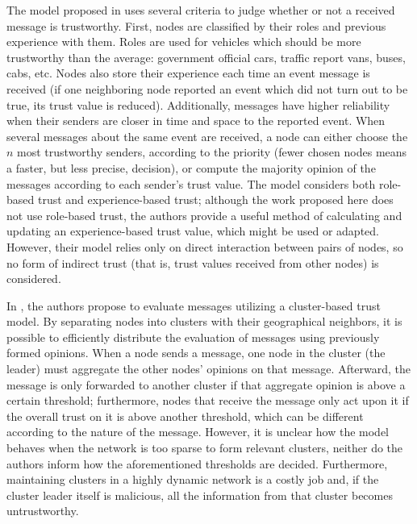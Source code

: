 The model proposed in \cite{minhas2010towards} uses several criteria to judge whether or not a received message is trustworthy.
First, nodes are classified by their roles and previous experience with them.
Roles are used for vehicles which should be more trustworthy than the average: government official cars, traffic report vans, buses, cabs, etc.
Nodes also store their experience each time an event message is received (if one neighboring node reported an event which did not turn out to be true, its trust value is reduced).
Additionally, messages have higher reliability when their senders are closer in time and space to the reported event.
When several messages about the same event are received, a node can either choose the $n$ most trustworthy senders, according to the priority (fewer chosen nodes means a faster, but less precise, decision), or compute the majority opinion of the messages according to each sender's trust value.
The model considers both role-based trust and experience-based trust; although the work proposed here does not use role-based trust, the authors provide a useful method of calculating and updating an experience-based trust value, which might be used or adapted.
However, their model relies only on direct interaction between pairs of nodes, so no form of indirect trust (that is, trust values received from other nodes) is considered.


In \cite{chen2010trust}, the authors propose to evaluate messages utilizing a cluster-based trust model.
By separating nodes into clusters with their geographical neighbors, it is possible to efficiently distribute the evaluation of messages using previously formed opinions.
When a node sends a message, one node in the cluster (the leader) must aggregate the other nodes' opinions on that message.
Afterward, the message is only forwarded to another cluster if that aggregate opinion is above a certain threshold; furthermore, nodes that receive the message only act upon it if the overall trust on it is above another threshold, which can be different according to the nature of the message.
However, it is unclear how the model behaves when the network is too sparse to form relevant clusters, neither do the authors inform how the aforementioned thresholds are decided.
Furthermore, maintaining clusters in a highly dynamic network is a costly job and, if the cluster leader itself is malicious, all the information from that cluster becomes untrustworthy.


